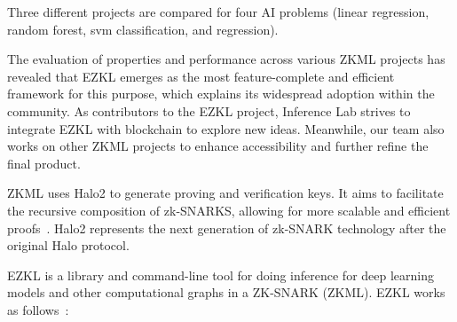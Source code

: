 \documentclass[conference]{IEEEtran}
\begin{document}
Three different projects are compared for four AI problems (linear regression, random forest, svm classification, and regression).

The evaluation of properties and performance across various ZKML projects has revealed that EZKL emerges as the most feature-complete and efficient framework for this purpose, which explains its widespread adoption within the community. As contributors to the EZKL project, Inference Lab strives to integrate EZKL with blockchain to explore new ideas. Meanwhile, our team also works on other ZKML projects to enhance accessibility and further refine the final product.

ZKML uses Halo2 to generate proving and verification keys.  It aims to facilitate the recursive composition of zk-SNARKS, allowing for more scalable and efficient proofs~\cite{ZcashHalo2GH}. Halo2 represents the next generation of zk-SNARK technology after the original Halo protocol.

EZKL is a library and command-line tool for doing inference for deep learning models and other computational graphs in a ZK-SNARK (ZKML). EZKL works as follows~\cite{ZconduitEZKLGH}:
\end{document}
